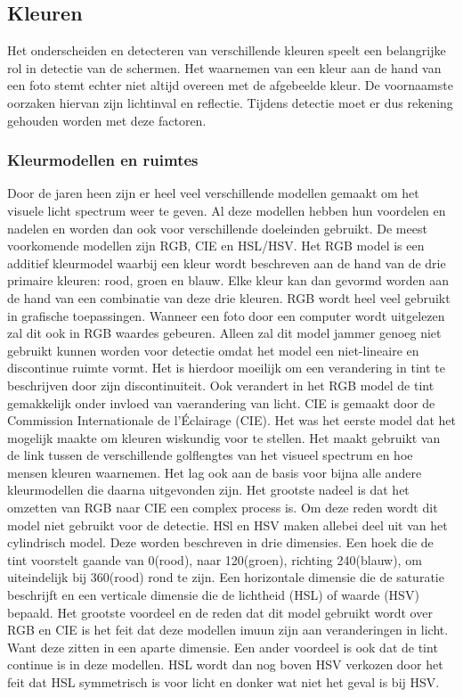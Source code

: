 
\subsection{Kleuren}
Het onderscheiden en detecteren van verschillende kleuren speelt een belangrijke rol in detectie van de schermen. Het waarnemen van een kleur aan de hand van een foto stemt echter niet altijd overeen met de afgebeelde kleur. De voornaamste oorzaken hiervan zijn lichtinval en reflectie. Tijdens detectie moet er dus rekening gehouden worden met deze factoren.

\subsubsection{Kleurmodellen en ruimtes}
Door de jaren heen zijn er heel veel verschillende modellen gemaakt om het visuele licht spectrum weer te geven. Al deze modellen hebben hun voordelen en nadelen en worden dan ook voor verschillende doeleinden gebruikt. De meest voorkomende modellen zijn RGB, CIE en HSL/HSV. Het RGB model is een additief kleurmodel waarbij een kleur wordt beschreven aan de hand van de drie primaire kleuren: rood, groen en blauw. Elke kleur kan dan gevormd worden aan de hand van een combinatie van deze drie kleuren. RGB wordt heel veel gebruikt in grafische toepassingen. Wanneer een foto door een computer wordt uitgelezen zal dit ook in RGB waardes gebeuren. Alleen zal dit model jammer genoeg niet gebruikt kunnen worden voor detectie omdat het model een niet-lineaire en discontinue ruimte vormt. Het is hierdoor moeilijk om een verandering in tint te beschrijven door zijn discontinuiteit. Ook verandert in het RGB model de tint gemakkelijk onder invloed van vaerandering van licht. CIE is gemaakt door de Commission Internationale de l'Éclairage (CIE). Het was het eerste model dat het mogelijk maakte om kleuren wiskundig voor te stellen. Het maakt gebruikt van de link tussen de verschillende golflengtes van het visueel spectrum en hoe mensen kleuren waarnemen. Het lag ook aan de basis voor bijna alle andere kleurmodellen die daarna uitgevonden zijn. Het grootste nadeel is dat het omzetten van RGB naar CIE een complex process is. Om deze reden wordt dit model niet gebruikt voor de detectie.  HSl en HSV maken allebei deel uit van het cylindrisch model. Deze worden beschreven in drie dimensies. Een hoek die de tint voorstelt gaande van 0\degree (rood), naar 120\degree (groen), richting 240\degree (blauw), om uiteindelijk bij 360\degree (rood) rond te zijn. Een horizontale dimensie die de saturatie beschrijft en een verticale dimensie die de lichtheid (HSL) of waarde (HSV) bepaald. Het grootste voordeel en de reden dat dit model gebruikt wordt over RGB en CIE is het feit dat deze modellen imuun zijn aan veranderingen in licht. Want deze zitten in een aparte dimensie. Een ander voordeel is ook dat de tint continue is in deze modellen. HSL wordt dan nog boven HSV verkozen door het feit dat HSL symmetrisch is voor licht en donker wat niet het geval is bij HSV.

